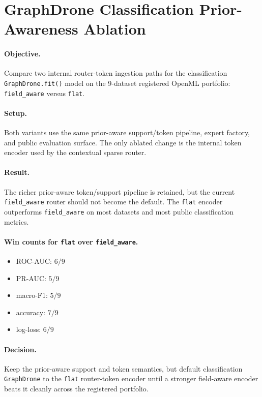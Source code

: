 \section{GraphDrone Classification Prior-Awareness Ablation}

\paragraph{Objective.}
Compare two internal router-token ingestion paths for the classification
\texttt{GraphDrone.fit()} model on the 9-dataset registered OpenML portfolio:
\texttt{field\_aware} versus \texttt{flat}.

\paragraph{Setup.}
Both variants use the same prior-aware support/token pipeline, expert factory,
and public evaluation surface. The only ablated change is the internal token
encoder used by the contextual sparse router.

\paragraph{Result.}
The richer prior-aware token/support pipeline is retained, but the current
\texttt{field\_aware} router should not become the default. The \texttt{flat}
encoder outperforms \texttt{field\_aware} on most datasets and most public
classification metrics.

\paragraph{Win counts for \texttt{flat} over \texttt{field\_aware}.}
\begin{itemize}
\item ROC-AUC: $6/9$
\item PR-AUC: $5/9$
\item macro-F1: $5/9$
\item accuracy: $7/9$
\item log-loss: $6/9$
\end{itemize}

\paragraph{Decision.}
Keep the prior-aware support and token semantics, but default classification
\texttt{GraphDrone} to the \texttt{flat} router-token encoder until a stronger
field-aware encoder beats it cleanly across the registered portfolio.
